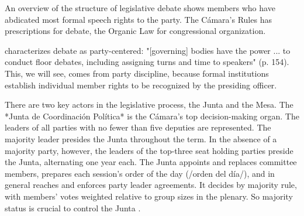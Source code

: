 \documentclass[letter,12pt]{article}
\begin{document}
An overview of the structure of legislative debate shows members who have abdicated most formal speech rights to the party. The Cámara's Rules \citep{reglamentoDipMx.2019} has prescriptions for debate, the Organic Law \citep{loceum.2019} for congressional organization.

\citet{casar.agsetting.2016} characterizes debate as party-centered: "[governing] bodies have the power ... to conduct floor debates, including assigning turns and time to speakers" (p. 154). This, we will see, comes from party discipline, because formal institutions establish individual member rights to be recognized by the presiding officer.



There are two key actors in the legislative process, the Junta and the Mesa. The *Junta de Coordinación Política* is the Cámara's top decision-making organ. The leaders of all parties with no fewer than five deputies are represented. The majority leader presides the Junta throughout the term. In the absence of a majority party, however, the leaders of the top-three seat holding parties preside the Junta, alternating one year each. The Junta appoints and replaces committee members, prepares each session's order of the day (/orden del día/), and in general reaches and enforces party leader agreements. It decides by majority rule, with members' votes weighted relative to group sizes in the plenary. So majority status is crucial to control the Junta \citep[cf.][]{cox.mccubbins.2005}.

\end{document}
